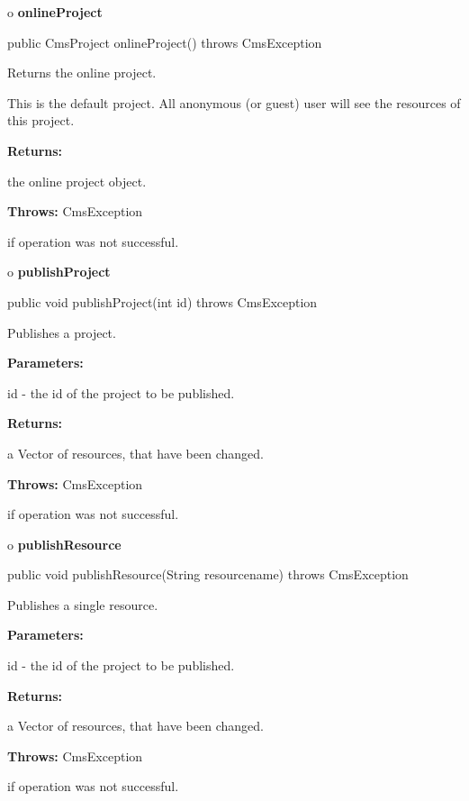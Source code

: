 o {\bf onlineProject}

\begin{PRE}
 public CmsProject onlineProject() throws CmsException
\end{PRE}

\begin{description}
\htmlDD Returns the online project.

This is the default project. All anonymous (or guest) user will see the
resources of this project.

\begin{description}
\item {\bf Returns:}

the online project object.
\item {\bf Throws:} CmsException

if operation was not successful.
\end{description}

\end{description}

o {\bf publishProject}

\begin{PRE}
 public void publishProject(int id) throws CmsException
\end{PRE}

\begin{description}
\htmlDD Publishes a project.

\begin{description}
\item {\bf Parameters:}

id - the id of the project to be published.
\item {\bf Returns:}

a Vector of resources, that have been changed.
\item {\bf Throws:} CmsException

if operation was not successful.
\end{description}

\end{description}

o {\bf publishResource}

\begin{PRE}
 public void publishResource(String resourcename) throws CmsException
\end{PRE}

\begin{description}
\htmlDD Publishes a single resource.

\begin{description}
\item {\bf Parameters:}

id - the id of the project to be published.
\item {\bf Returns:}

a Vector of resources, that have been changed.
\item {\bf Throws:} CmsException

if operation was not successful.
\end{description}

\end{description}

